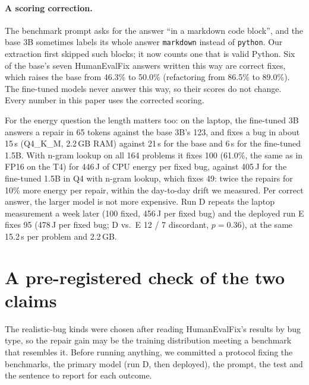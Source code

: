 \documentclass[11pt]{article}
\begin{document}
\paragraph{A scoring correction.} The benchmark prompt asks for the answer ``in a markdown code
block'', and the base 3B sometimes labels its whole answer \texttt{markdown} instead of
\texttt{python}. Our extraction first skipped such blocks; it now counts one that is valid Python.
Six of the base's seven HumanEvalFix answers written this way are correct fixes, which raises the
base from 46.3\% to 50.0\% (refactoring from 86.5\% to 89.0\%). The fine-tuned models never answer
this way, so their scores do not change. Every number in this paper uses the corrected scoring.

For the energy question the length matters too: on the laptop, the fine-tuned 3B answers a repair
in 65 tokens against the base 3B's 123, and fixes a bug in about 15\,s (Q4\_K\_M, 2.2\,GB RAM)
against 21\,s for the base and 6\,s for the fine-tuned 1.5B. With n-gram lookup on all 164
problems it fixes 100 (61.0\%, the same as in FP16 on the T4) for 446\,J of CPU energy per fixed bug,
against 405\,J for the fine-tuned 1.5B in Q4 with n-gram lookup, which fixes 49: twice the repairs for
10\% more energy per repair, within the day-to-day drift we measured. Per correct answer, the larger
model is not more expensive. Run D repeats the laptop measurement a week later (100 fixed, 456\,J
per fixed bug) and the deployed run E fixes 95 (478\,J per fixed bug; D vs.\ E 12 / 7 discordant,
$p=0.36$), at the same 15.2\,s per problem and 2.2\,GB.

\section{A pre-registered check of the two claims}
\label{sec:prereg}

The realistic-bug kinds were chosen after reading HumanEvalFix's results by bug type, so the
repair gain may be the training distribution meeting a benchmark that resembles it. Before running
anything, we committed a protocol fixing the benchmarks, the primary model (run D, then deployed),
the prompt, the test and the sentence to report for each outcome.
\end{document}
